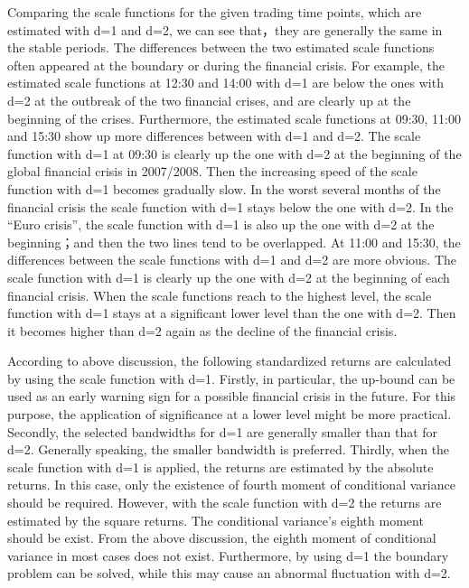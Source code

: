 Comparing the scale functions for the given trading time points, which are estimated with d=1 and d=2, we can see that，they are generally the same in the stable periods. The differences between the two estimated scale functions often appeared at the boundary or during the financial crisis. For example, the estimated scale functions at 12:30 and 14:00 with d=1 are below the ones with d=2 at the outbreak of the two financial crises, and are clearly up at the beginning of the crises. 
Furthermore, the estimated scale functions at 09:30, 11:00 and 15:30 show up more differences between with d=1 and d=2. The scale function with d=1 at 09:30 is clearly up the one with d=2 at the beginning of the global financial crisis in 2007/2008. Then the increasing speed of the scale function with d=1 becomes gradually slow. In the worst several months of the financial crisis the scale function with d=1 stays below the one with d=2. In the “Euro crisis”, the scale function with d=1 is also up the one with d=2 at the beginning；and then the two lines tend to be overlapped. At 11:00 and 15:30, the differences between the scale functions with d=1 and d=2 are more obvious. The scale function with d=1 is clearly up the one with d=2 at the beginning of each financial crisis. When the scale functions reach to the highest level, the scale function with d=1 stays at a significant lower level than the one with d=2. Then it becomes higher than d=2 again as the decline of the financial crisis.

According to above discussion, the following standardized returns are calculated by using the scale function with d=1. Firstly, in particular, the up-bound can be used as an early warning sign for a possible financial crisis in the future. For this purpose, the application of significance at a lower level might be more practical. Secondly, the selected bandwidths for d=1 are generally smaller than that for d=2. Generally speaking, the smaller bandwidth is preferred. Thirdly, when the scale function with d=1 is applied, the returns are estimated by the absolute returns. In this case, only the existence of fourth moment of conditional variance should be required. However, with the scale function with d=2 the returns are estimated by the square returns. The conditional variance’s eighth moment should be exist. From the above discussion, the eighth moment of conditional variance in most cases does not exist. Furthermore, by using d=1 the boundary problem can be solved, while this may cause an abnormal fluctuation with d=2.


